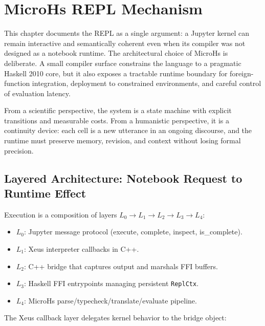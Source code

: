 \section{MicroHs REPL Mechanism}
\label{sec:repl}

This chapter documents the REPL as a single argument: a Jupyter kernel can remain interactive and semantically coherent even when its compiler was not designed as a notebook runtime. The architectural choice of MicroHs is deliberate. A small compiler surface constrains the language to a pragmatic Haskell 2010 core, but it also exposes a tractable runtime boundary for foreign-function integration, deployment to constrained environments, and careful control of evaluation latency.

From a scientific perspective, the system is a state machine with explicit transitions and measurable costs. From a humanistic perspective, it is a continuity device: each cell is a new utterance in an ongoing discourse, and the runtime must preserve memory, revision, and context without losing formal precision.

\subsection{Layered Architecture: Notebook Request to Runtime Effect}

Execution is a composition of layers
$L_0 \to L_1 \to L_2 \to L_3 \to L_4$:

\begin{itemize}
\item $L_0$: Jupyter message protocol (execute, complete, inspect, is\_complete).
\item $L_1$: Xeus interpreter callbacks in C++.
\item $L_2$: C++ bridge that captures output and marshals FFI buffers.
\item $L_3$: Haskell FFI entrypoints managing persistent \verb|ReplCtx|.
\item $L_4$: MicroHs parse/typecheck/translate/evaluate pipeline.
\end{itemize}

The Xeus callback layer delegates kernel behavior to the bridge object:

